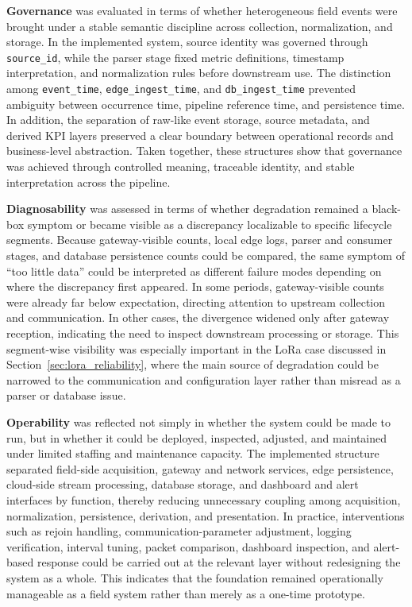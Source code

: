 \documentclass[systems,article,submit,pdftex,moreauthors]{Definitions/mdpi}
\begin{document}
\textbf{Governance} was evaluated in terms of whether heterogeneous field events were brought under a stable semantic discipline across collection, normalization, and storage. In the implemented system, source identity was governed through \texttt{source\_id}, while the parser stage fixed metric definitions, timestamp interpretation, and normalization rules before downstream use. The distinction among \texttt{event\_time}, \texttt{edge\_ingest\_time}, and \texttt{db\_ingest\_time} prevented ambiguity between occurrence time, pipeline reference time, and persistence time. In addition, the separation of raw-like event storage, source metadata, and derived KPI layers preserved a clear boundary between operational records and business-level abstraction. Taken together, these structures show that governance was achieved through controlled meaning, traceable identity, and stable interpretation across the pipeline.

\textbf{Diagnosability} was assessed in terms of whether degradation remained a black-box symptom or became visible as a discrepancy localizable to specific lifecycle segments. Because gateway-visible counts, local edge logs, parser and consumer stages, and database persistence counts could be compared, the same symptom of ``too little data'' could be interpreted as different failure modes depending on where the discrepancy first appeared. In some periods, gateway-visible counts were already far below expectation, directing attention to upstream collection and communication. In other cases, the divergence widened only after gateway reception, indicating the need to inspect downstream processing or storage. This segment-wise visibility was especially important in the LoRa case discussed in Section~\ref{sec:lora_reliability}, where the main source of degradation could be narrowed to the communication and configuration layer rather than misread as a parser or database issue.

\textbf{Operability} was reflected not simply in whether the system could be made to run, but in whether it could be deployed, inspected, adjusted, and maintained under limited staffing and maintenance capacity. The implemented structure separated field-side acquisition, gateway and network services, edge persistence, cloud-side stream processing, database storage, and dashboard and alert interfaces by function, thereby reducing unnecessary coupling among acquisition, normalization, persistence, derivation, and presentation. In practice, interventions such as rejoin handling, communication-parameter adjustment, logging verification, interval tuning, packet comparison, dashboard inspection, and alert-based response could be carried out at the relevant layer without redesigning the system as a whole. This indicates that the foundation remained operationally manageable as a field system rather than merely as a one-time prototype.
\end{document}
